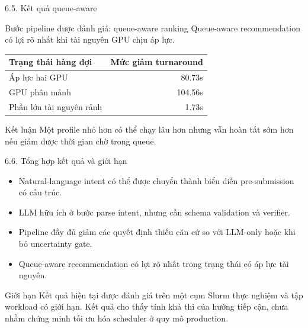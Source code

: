 \begin{frame}[t]{6.5. Kết quả queue-aware}
\small
\begin{block}{Bước pipeline được đánh giá: queue-aware ranking}
Queue-aware recommendation có lợi rõ nhất khi tài nguyên GPU chịu áp lực.
\end{block}
\centering
\begin{tabular}{lr}
\toprule
\textbf{Trạng thái hàng đợi} & \textbf{Mức giảm turnaround} \\
\midrule
Áp lực hai GPU & 80.73s \\
GPU phân mảnh & 104.56s \\
Phần lớn tài nguyên rảnh & 1.73s \\
\bottomrule
\end{tabular}
\vspace{0.35cm}
\begin{exampleblock}{Kết luận}
Một profile nhỏ hơn có thể chạy lâu hơn nhưng vẫn hoàn tất sớm hơn nếu giảm được thời gian chờ trong queue.
\end{exampleblock}
\end{frame}

\begin{frame}[t,shrink=5]{6.6. Tổng hợp kết quả và giới hạn}
\small
\begin{itemize}
  \item Natural-language intent có thể được chuyển thành biểu diễn pre-submission có cấu trúc.
  \item LLM hữu ích ở bước parse intent, nhưng cần schema validation và verifier.
  \item Pipeline đầy đủ giảm các quyết định thiếu căn cứ so với LLM-only hoặc khi bỏ uncertainty gate.
  \item Queue-aware recommendation có lợi rõ nhất trong trạng thái có áp lực tài nguyên.
\end{itemize}
\begin{alertblock}{Giới hạn}
Kết quả hiện tại được đánh giá trên một cụm Slurm thực nghiệm và tập workload có giới hạn. Kết quả cho thấy tính khả thi của hướng tiếp cận, chưa nhằm chứng minh tối ưu hóa scheduler ở quy mô production.
\end{alertblock}
\end{frame}
